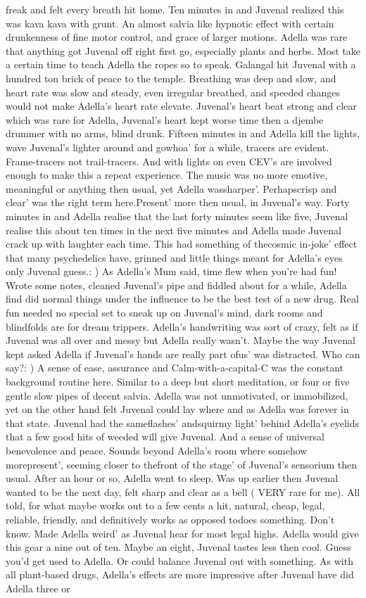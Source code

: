 \documentclass[12pt]{book}
\begin{document}
freak and felt every breath hit home. Ten minutes in and Juvenal realized this was kava kava with grunt. An almost salvia like hypnotic effect with certain drunkenness of fine motor control, and grace of larger motions. Adella was rare that anything got Juvenal off right first go, especially plants and herbs. Most take a certain time to teach Adella the ropes so to speak. Galangal hit Juvenal with a hundred ton brick of peace to the temple. Breathing was deep and slow, and heart rate was slow and steady, even irregular breathed, and speeded changes would not make Adella's heart rate elevate. Juvenal's heart beat strong and clear which was rare for Adella, Juvenal's heart kept worse time then a djembe drummer with no arms, blind drunk. Fifteen minutes in and Adella kill the lights, wave Juvenal's lighter around and gowhoa' for a while, tracers are evident. Frame-tracers not trail-tracers. And with lights on even CEV's are involved enough to make this a repeat experience. The music was no more emotive, meaningful or anything then usual, yet Adella wassharper'. Perhapscrisp and clear' was the right term here.Present' more then usual, in Juvenal's way. Forty minutes in and Adella realise that the last forty minutes seem like five, Juvenal realise this about ten times in the next five minutes and Adella made Juvenal crack up with laughter each time. This had something of thecosmic in-joke' effect that many psychedelics have, grinned and little things meant for Adella's eyes only Juvenal guess.: ) As Adella's Mum said, time flew when you're had fun! Wrote some notes, cleaned Juvenal's pipe and fiddled about for a while, Adella find did normal things under the influence to be the best test of a new drug. Real fun needed no special set to sneak up on Juvenal's mind, dark rooms and blindfolds are for dream trippers. Adella's handwriting was sort of crazy, felt as if Juvenal was all over and messy but Adella really wasn't. Maybe the way Juvenal kept asked Adella if Juvenal's hands are really part ofus' was distracted. Who can say?: ) A sense of ease, assurance and Calm-with-a-capital-C was the constant background routine here. Similar to a deep but short meditation, or four or five gentle slow pipes of decent salvia. Adella was not unmotivated, or immobilized, yet on the other hand felt Juvenal could lay where and as Adella was forever in that state. Juvenal had the sameflashes' andsquirmy light' behind Adella's eyelids that a few good hits of weeded will give Juvenal. And a sense of universal benevolence and peace. Sounds beyond Adella's room where somehow morepresent', seeming closer to thefront of the stage' of Juvenal's sensorium then usual. After an hour or so, Adella went to sleep. Was up earlier then Juvenal wanted to be the next day, felt sharp and clear as a bell ( VERY rare for me). All told, for what maybe works out to a few cents a hit, natural, cheap, legal, reliable, friendly, and definitively works as opposed todoes something. Don't know. Made Adella weird' as Juvenal hear for most legal highs. Adella would give this gear a nine out of ten. Maybe an eight, Juvenal tastes less then cool. Guess you'd get used to Adella. Or could balance Juvenal out with something. As with all plant-based drugs, Adella's effects are more impressive after Juvenal have did Adella three or 
\end{document}
